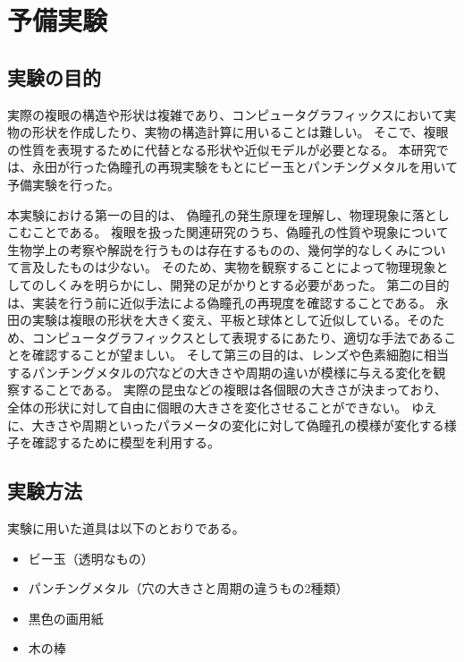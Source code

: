 \chapter{予備実験}
\label{CExperiment}

\section{実験の目的}
\label{SExperimentPurpose}


実際の複眼の構造や形状は複雑であり、コンピュータグラフィックスにおいて実物の形状を作成したり、実物の構造計算に用いることは難しい。
そこで、複眼の性質を表現するために代替となる形状や近似モデルが必要となる。
本研究では、永田\cite{永田敏夫:2008-03-10}が行った偽瞳孔の再現実験をもとにビー玉とパンチングメタルを用いて予備実験を行った。

本実験における第一の目的は、 偽瞳孔の発生原理を理解し、物理現象に落としこむことである。
複眼を扱った関連研究のうち、偽瞳孔の性質や現象について生物学上の考察や解説を行うものは存在するものの、幾何学的なしくみについて言及したものは少ない。
そのため、実物を観察することによって物理現象としてのしくみを明らかにし、開発の足がかりとする必要があった。
第二の目的は、実装を行う前に近似手法による偽瞳孔の再現度を確認することである。
永田の実験は複眼の形状を大きく変え、平板と球体として近似している。そのため、コンピュータグラフィックスとして表現するにあたり、適切な手法であることを確認することが望ましい。
そして第三の目的は、レンズや色素細胞に相当するパンチングメタルの穴などの大きさや周期の違いが模様に与える変化を観察することである。
実際の昆虫などの複眼は各個眼の大きさが決まっており、全体の形状に対して自由に個眼の大きさを変化させることができない。
ゆえに、大きさや周期といったパラメータの変化に対して偽瞳孔の模様が変化する様子を確認するために模型を利用する。

\section{実験方法}
\label{SExperimentMethod}

実験に用いた道具は以下のとおりである\figref{}。

\begin{itemize}
\item ビー玉（透明なもの）
\item パンチングメタル（穴の大きさと周期の違うもの2種類）
\item 黒色の画用紙
\item 木の棒
\end{itemize}

